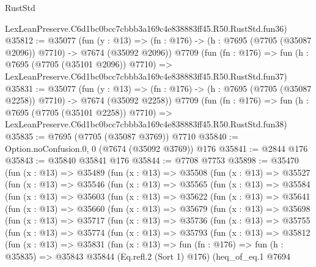 \begin{lexlean}{RustStd}
\begin{coremodule}
    LexLeanPreserve.C6d1bc0bcc7cbbb3a169c4e838883ff45.R50.RustStd.fun36)
@35812 := @35077
    (fun (y : @13) =>
    (fn : @176) -> (h : @7695 (@7705 (@35087 @2096)) @7710) -> @7674 (@35092 @2096))
    @7709
    (fun (fn : @176) =>
    fun (h : @7695 (@7705 (@35101 @2096)) @7710) =>
    LexLeanPreserve.C6d1bc0bcc7cbbb3a169c4e838883ff45.R50.RustStd.fun37)
@35831 := @35077
    (fun (y : @13) =>
    (fn : @176) -> (h : @7695 (@7705 (@35087 @2258)) @7710) -> @7674 (@35092 @2258))
    @7709
    (fun (fn : @176) =>
    fun (h : @7695 (@7705 (@35101 @2258)) @7710) =>
    LexLeanPreserve.C6d1bc0bcc7cbbb3a169c4e838883ff45.R50.RustStd.fun38)
@35835 := @7695 (@7705 (@35087 @3769)) @7710
@35840 := Option.noConfusion.{0, 0} (@7674 (@35092 @3769)) @176
@35841 := @2844 @176
@35843 := @35840 @35841 @176
@35844 := @7708 @7753
@35898 := @35470
    (fun (x : @13) =>
    @35489
      (fun (x : @13) =>
      @35508
        (fun (x : @13) =>
        @35527
          (fun (x : @13) =>
          @35546
            (fun (x : @13) =>
            @35565
              (fun (x : @13) =>
              @35584
                (fun (x : @13) =>
                @35603
                  (fun (x : @13) =>
                  @35622
                    (fun (x : @13) =>
                    @35641
                      (fun (x : @13) =>
                      @35660
                        (fun (x : @13) =>
                        @35679
                          (fun (x : @13) =>
                          @35698
                            (fun (x : @13) =>
                            @35717
                              (fun (x : @13) =>
                              @35736
                                (fun (x : @13) =>
                                @35755
                                  (fun (x : @13) =>
                                  @35774
                                    (fun (x : @13) =>
                                    @35793
                                      (fun (x : @13) =>
                                      @35812
                                        (fun (x : @13) =>
                                        @35831
                                          (fun (x : @13) =>
                                          fun (fn : @176) =>
                                          fun (h : @35835) =>
                                          @35843
                                            @35844
                                            (Eq.refl.{2} (Sort 1) @176)
                                            (heq_of_eq.{1}
                                              @7694

\end{coremodule}
\end{lexlean}
